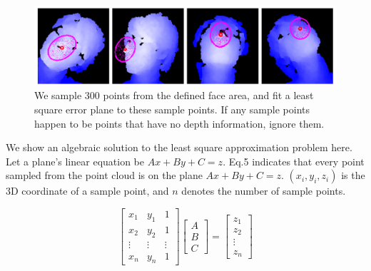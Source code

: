 \begin{figure}
\includegraphics[width=1.0\linewidth]{./fig10.png}
\caption{We sample 300 points from the defined face area, and fit a least square error plane to these sample points. If any sample points happen to be points that have no depth information, ignore them.}
\label{fig:10}       %
\end{figure}

We show an algebraic solution to the least square approximation problem here. Let a plane’s linear equation be $Ax+By+C=z$. Eq.5 indicates that every point sampled from the point cloud is on the plane $Ax+By+C=z$. $(x_{i},y_{i},z_{i})$ is the 3D coordinate of a sample point, and $n$ denotes the number of sample points. 
\begin{small}	%
\begin{equation}
\begin{bmatrix}
x_{1} & y_{1} & 1	\\
x_{2} & y_{2} & 1	\\
\vdots & \vdots & \vdots		\\
x_{n} & y_{n} & 1
\end{bmatrix}
\begin{bmatrix}
A	\\
B	\\
C
\end{bmatrix}
=
\begin{bmatrix}
z_{1}	\\
z_{2}	\\
\vdots		\\
z_{n}
\end{bmatrix}
\end{equation}
\end{small}


